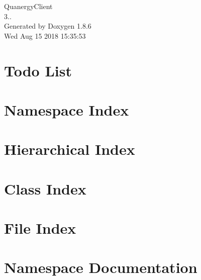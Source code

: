 \documentclass[twoside]{book}
\newcommand{\clearemptydoublepage}{%
  \newpage{\pagestyle{empty}\cleardoublepage}%
}
\begin{document}
\hypersetup{pageanchor=false}
\begin{titlepage}
\vspace*{7cm}
\begin{center}%
{\Large Quanergy\-Client \\[1ex]\large 3.. }\\
\vspace*{1cm}
{\large Generated by Doxygen 1.8.6}\\
\vspace*{0.5cm}
{\small Wed Aug 15 2018 15:35:53}\\
\end{center}
\end{titlepage}
\clearemptydoublepage
\tableofcontents
\clearemptydoublepage
{}
\hypersetup{pageanchor=true}

\chapter{Todo List}
\label{todo}
\hypertarget{todo}{}

\chapter{Namespace Index}

\chapter{Hierarchical Index}

\chapter{Class Index}

\chapter{File Index}

\chapter{Namespace Documentation}

\end{document}
